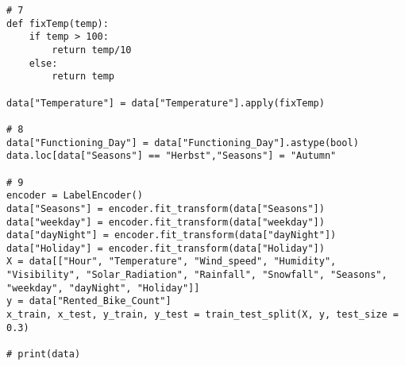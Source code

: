 \documentclass{article}
\begin{document}
\begin{lstlisting}[tabsize=2]
# 7
def fixTemp(temp):
	if temp > 100:
		return temp/10
	else:
		return temp

data["Temperature"] = data["Temperature"].apply(fixTemp)

# 8
data["Functioning_Day"] = data["Functioning_Day"].astype(bool)
data.loc[data["Seasons"] == "Herbst","Seasons"] = "Autumn"

# 9
encoder = LabelEncoder()
data["Seasons"] = encoder.fit_transform(data["Seasons"])
data["weekday"] = encoder.fit_transform(data["weekday"])
data["dayNight"] = encoder.fit_transform(data["dayNight"])
data["Holiday"] = encoder.fit_transform(data["Holiday"])
X = data[["Hour", "Temperature", "Wind_speed", "Humidity", "Visibility", "Solar_Radiation", "Rainfall", "Snowfall", "Seasons", "weekday", "dayNight", "Holiday"]]
y = data["Rented_Bike_Count"]
x_train, x_test, y_train, y_test = train_test_split(X, y, test_size = 0.3)

# print(data)
	\end{lstlisting}
	
\end{document}
